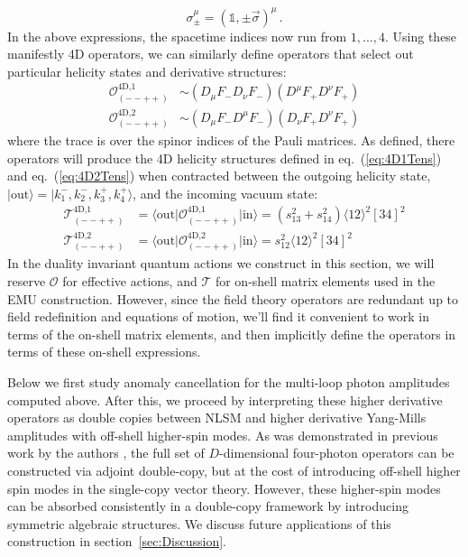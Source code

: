 \documentclass[11pt,letter]{article}
\def\sec#1{section~\ref{#1}}
\def\eqn#1{eq.~(\ref{#1})}
\begin{document}
\begin{equation}
\sigma_\pm^\mu = (\mathbb{1},\pm \vec{\sigma})^\mu\,.
\end{equation}
In the above expressions, the spacetime indices now run from $1,...,4$. Using these manifestly 4D operators, we can similarly define operators that select out particular helicity states and derivative structures:
\begin{align}
\mathcal{O}^{\text{4D,1}}_{(--++)} &\sim (D_\mu F_- D_\nu F_-)(D^\mu F_+ D^\nu F_+)
\\
\mathcal{O}^{\text{4D,2}}_{(--++)} &\sim (D_\mu F_- D^\mu F_-)(D_\nu F_+ D^\nu F_+)
\end{align}
where the trace is over the spinor indices of the Pauli matrices. As defined, there operators will produce the 4D helicity structures defined in \eqn{eq:4D1Tens} and \eqn{eq:4D2Tens} when contracted between the outgoing helicity state, $|\text{out}\rangle = |k_1^-,k_2^-,k_3^+,k_4^+\rangle$, and the incoming vacuum state:
\begin{align}
\mathcal{T}^{\text{4D,1}}_{(--++)} &=\langle \text{out}\big| \mathcal{O}^{\text{4D,1}}_{(--++)}  \big|\text{in}\rangle = (s_{13}^2 +s_{14}^2)\langle 12\rangle^2[34]^2
\\
\mathcal{T}^{\text{4D,2}}_{(--++)} &= \langle \text{out}\big|\mathcal{O}^{\text{4D,2}}_{(--++)}  \big|\text{in}\rangle =s_{12}^2 \langle 12\rangle^2[34]^2
\end{align}
In the duality invariant quantum actions we construct in this section, we will reserve $\mathcal{O}$ for effective actions, and $\mathcal{T}$ for on-shell matrix elements used in the EMU construction. However, since the field theory operators are redundant up to field redefinition and equations of motion, we'll find it convenient to work in terms of the on-shell matrix elements, and then implicitly define the operators in terms of these on-shell expressions. 

Below we first study anomaly cancellation for the multi-loop photon amplitudes computed above. After this, we proceed by interpreting these higher derivative operators as double copies between NLSM and higher derivative Yang-Mills amplitudes with off-shell higher-spin modes. As was demonstrated in previous work by the authors \cite{Carrasco:2022jxn}, the full set of $D$-dimensional four-photon operators can be constructed via adjoint double-copy, but at the cost of introducing off-shell higher spin modes in the single-copy vector theory. However, these higher-spin modes can be absorbed consistently in a double-copy framework by introducing symmetric algebraic structures. We discuss future applications of this construction in \sec{sec:Discussion}.
\end{document}
